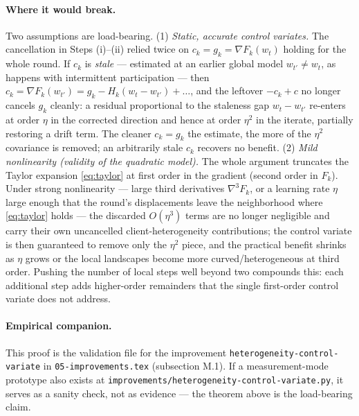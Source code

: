 \documentclass[11pt]{article}
\theoremstyle{definition}
\theoremstyle{remark}
\begin{document}
\paragraph{Where it would break.}
Two assumptions are load-bearing. (1) \emph{Static, accurate control variates.} The
cancellation in Steps (i)--(ii) relied twice on $c_k=g_k=\nabla F_k(w_t)$ holding for the whole
round. If $c_k$ is \emph{stale} --- estimated at an earlier global model $w_{t'}\neq w_t$, as
happens with intermittent participation --- then $c_k=\nabla F_k(w_{t'})=g_k-H_k(w_t-w_{t'})+
\dots$, and the leftover $-c_k+c$ no longer cancels $g_k$ cleanly: a residual proportional to
the staleness gap $w_t-w_{t'}$ re-enters at order $\eta$ in the corrected direction and hence at
order $\eta^2$ in the iterate, partially restoring a drift term. The cleaner $c_k=g_k$ the
estimate, the more of the $\eta^2$ covariance is removed; an arbitrarily stale $c_k$ recovers
no benefit. (2) \emph{Mild nonlinearity (validity of the quadratic model).} The whole argument
truncates the Taylor expansion \eqref{eq:taylor} at first order in the gradient (second order in
$F_k$). Under strong nonlinearity --- large third derivatives $\nabla^3 F_k$, or a learning rate
$\eta$ large enough that the round's displacements leave the neighborhood where
\eqref{eq:taylor} holds --- the discarded $O(\eta^3)$ terms are no longer negligible and carry
their own uncancelled client-heterogeneity contributions; the control variate is then guaranteed
to remove only the $\eta^2$ piece, and the practical benefit shrinks as $\eta$ grows or the
local landscapes become more curved/heterogeneous at third order. Pushing the number of local
steps well beyond two compounds this: each additional step adds higher-order remainders that the
single first-order control variate does not address.

\paragraph{Empirical companion.}
This proof is the validation file for the improvement \texttt{heterogeneity-control-variate} in
\texttt{05-improvements.tex} (subsection M.1). If a measurement-mode prototype also exists at
\texttt{improvements/heterogeneity-control-variate.py}, it serves as a sanity check, not as
evidence --- the theorem above is the load-bearing claim.
\end{document}
